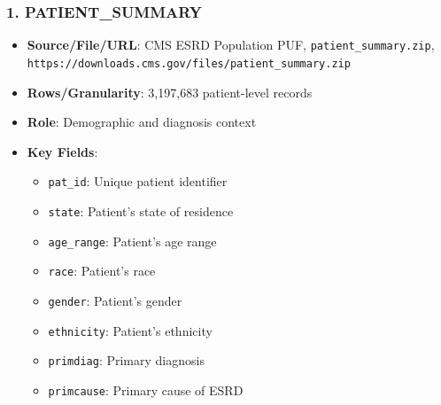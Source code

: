 \documentclass[conference]{IEEEtran}
\begin{document}
\subsubsection{1. PATIENT_SUMMARY}
\begin{itemize}
    \item \textbf{Source/File/URL}: CMS ESRD Population PUF, \texttt{patient_summary.zip}, \texttt{https://downloads.cms.gov/files/patient_summary.zip}
    \item \textbf{Rows/Granularity}: 3,197,683 patient-level records
    \item \textbf{Role}: Demographic and diagnosis context
    \item \textbf{Key Fields}:
    \begin{itemize}
        \item \texttt{pat_id}: Unique patient identifier
        \item \texttt{state}: Patient's state of residence
        \item \texttt{age_range}: Patient's age range
        \item \texttt{race}: Patient's race
        \item \texttt{gender}: Patient's gender
        \item \texttt{ethnicity}: Patient's ethnicity
        \item \texttt{primdiag}: Primary diagnosis
        \item \texttt{primcause}: Primary cause of ESRD
    \end{itemize}
\end{itemize}
\end{document}
